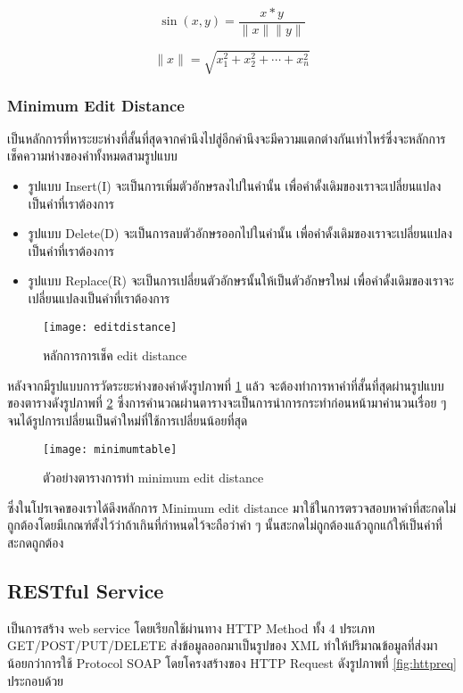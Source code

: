 \begin{equation}
    \sin(x,y)=\frac{x*y}{\|x\|\|y\|}
\end{equation}    

\begin{equation}
    \|x\|=\sqrt{x_{1}^2+x_{2}^2+\cdots+x_{n}^2}
\end{equation}    
\subsubsection{Minimum Edit Distance}

เป็นหลักการที่หาระยะห่างที่สั้นที่สุดจากคำนึงไปสู่อีกคำนึงจะมีความแตกต่างกันเท่าไหร่ซึ่งจะหลักการเช็คความห่างของคำทั้งหมดสามรูปแบบ
\begin{itemize}
    \item รูปแบบ Insert(I) จะเป็นการเพิ่มตัวอักษรลงไปในคำนั้น เพื่อคำดั้งเดิมของเราจะเปลี่ยนแปลงเป็นคำที่เราต้องการ
    \item รูปแบบ Delete(D) จะเป็นการลบตัวอักษรออกไปในคำนั้น เพื่อคำดั้งเดิมของเราจะเปลี่ยนแปลงเป็นคำที่เราต้องการ
    \item รูปแบบ Replace(R) จะเป็นการเปลี่ยนตัวอักษรนั้นให้เป็นตัวอักษรใหม่ เพื่อคำดั้งเดิมของเราจะเปลี่ยนแปลงเป็นคำที่เราต้องการ
\end{itemize}
\begin{figure}[H]
    \centering
    \texttt{[image: editdistance]}
    \caption{หลักการการเช็ค edit distance \cite{ritambhara}}\label{fig:editdistance}
\end{figure}
หลังจากมีรูปแบบการวัดระยะห่างของคำดังรูปภาพที่ \ref{fig:editdistance} แล้ว จะต้องทำการหาคำที่สั้นที่สุดผ่านรูปแบบของตารางดังรูปภาพที่ \ref{fig:minimumtable} ซึ่งการคำนวณผ่านตารางจะเป็นการนำการกระทำก่อนหน้ามาคำนวนเรื่อย ๆ จนได้รูปการเปลี่ยนเป็นคำใหม่ที่ใช้การเปลี่ยนน้อยที่สุด
\begin{figure}[H]
    \centering
    \texttt{[image: minimumtable]}
    \caption{ตัวอย่างตารางการทำ minimum edit distance \cite{ritambhara}}\label{fig:minimumtable}
\end{figure}

ซึ่งในโปรเจคของเราได้ดึงหลักการ Minimum edit distance มาใช้ในการตรวจสอบหาคำที่สะกดไม่ถูกต้องโดยมีเกณฑ์ตั้งไว้ว่าถ้าเกินที่กำหนดไว้จะถือว่าคำ ๆ นั้นสะกดไม่ถูกต้องแล้วถูกแก้ให้เป็นคำที่สะกดถูกต้อง

\subsection{RESTful Service}
เป็นการสร้าง web service โดยเรียกใช้ผ่านทาง HTTP Method ทั้ง 4 ประเภท GET/POST/PUT/DELETE ส่งข้อมูลออกมาเป็นรูปของ XML ทำให้ปริมาณข้อมูลที่ส่งมาน้อยกว่าการใช้ Protocol SOAP  โดยโครงสร้างของ 
HTTP Request ดังรูปภาพที่ \ref{fig:httpreq} ประกอบด้วย 

